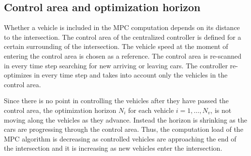 \documentclass[letterpaper,10pt,conference]{ieeeconf}
\begin{document}
\subsection{Control area and optimization horizon}
Whether a vehicle is included in the MPC computation depends on its distance to the intersection. The control area of the centralized controller is defined for a certain surrounding of the intersection. The vehicle speed at the moment of entering the control area is chosen as a reference. The control area is re-scanned in every time step searching for new arriving or leaving cars. The controller re-optimizes in every time step and takes into account only the vehicles in the control area. %

Since there is no point in controlling the vehicles after they have passed the control area, the optimization horizon $N_i$ for each vehicle $i = 1,\ldots,N_v$, is not moving along the vehicles as they advance. Instead the horizon is shrinking as the cars are progressing through the control area. Thus, the computation load of the MPC algorithm is decreasing as controlled vehicles are approaching the end of the intersection and it is increasing as new vehicles enter the intersection.
\end{document}
